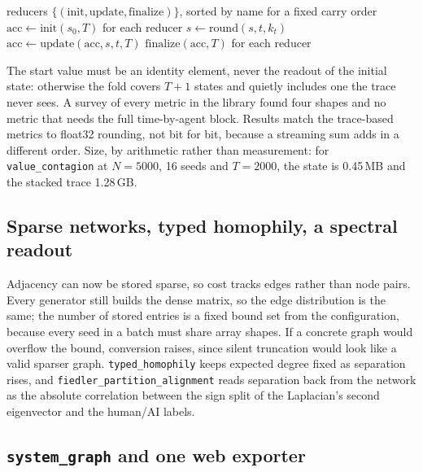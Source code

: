 \documentclass[11pt]{article}
\newcommand{\code}[1]{\texttt{#1}}
\begin{document}
\begin{algorithm}[H]
\caption{\code{run\_scan\_reduce}: a scan with reducers in the carry}
\begin{algorithmic}[1]
\Require reducers $\{(\text{init}, \text{update}, \text{finalize})\}$, sorted by name for a fixed carry order
\State $\text{acc} \gets \text{init}(s_0, T)$ for each reducer 
 \Comment{one \code{lax.scan}}
  \State $s \gets \text{round}(s, t, k_t)$
  \State $\text{acc} \gets \text{update}(\text{acc}, s, t, T)$ 
\EndFor
\State \Return $\text{finalize}(\text{acc}, T)$ for each reducer
\end{algorithmic}
\end{algorithm}

\noindent The start value must be an identity element, never the readout of the
initial state: otherwise the fold covers $T+1$ states and quietly includes one the
trace never sees. A survey of every metric in the library found four shapes and no
metric that needs the full time-by-agent block. Results match the trace-based metrics
to float32 rounding, not bit for bit, because a streaming sum adds in a different
order. Size, by arithmetic rather than measurement: for \code{value\_contagion} at
$N=5000$, 16 seeds and $T=2000$, the state is 0.45\,MB and the stacked trace 1.28\,GB.

\subsection{Sparse networks, typed homophily, a spectral readout}

Adjacency can now be stored sparse, so cost tracks edges rather than node pairs. Every
generator still builds the dense matrix, so the edge distribution is the same; the
number of stored entries is a fixed bound set from the configuration, because every
seed in a batch must share array shapes. If a concrete graph would overflow the bound,
conversion raises, since silent truncation would look like a valid sparser graph.
\code{typed\_homophily} keeps expected degree fixed as separation rises, and
\code{fiedler\_partition\_alignment} reads separation back from the network as the
absolute correlation between the sign split of the Laplacian's second eigenvector and
the human/AI labels.

\subsection{\code{system\_graph} and one web exporter}
\end{document}
